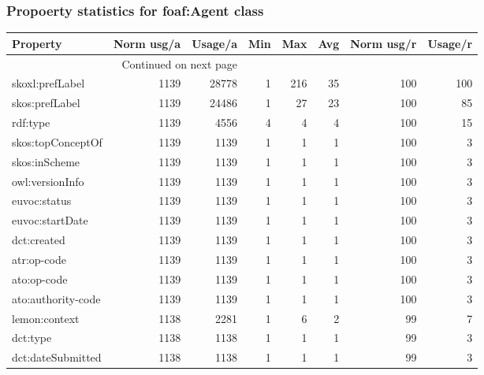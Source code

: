 \documentclass[10pt,a4paper,titlepage,final]{article}
\begin{document}
\subsubsection{Propoerty statistics for foaf:Agent class}
\begin{longtable}{lrrrrrrr}
\toprule
               Property &  Norm usg/a &  Usage/a &  Min &  Max &  Avg &  Norm usg/r &  Usage/r \\
\midrule
\endhead
\midrule
\multicolumn{3}{r}{{Continued on next page}} \\
\midrule
\endfoot

\bottomrule
\endlastfoot
        skoxl:prefLabel &        1139 &    28778 &    1 &  216 &   35 &         100 &      100 \\
         skos:prefLabel &        1139 &    24486 &    1 &   27 &   23 &         100 &       85 \\
               rdf:type &        1139 &     4556 &    4 &    4 &    4 &         100 &       15 \\
      skos:topConceptOf &        1139 &     1139 &    1 &    1 &    1 &         100 &        3 \\
          skos:inScheme &        1139 &     1139 &    1 &    1 &    1 &         100 &        3 \\
        owl:versionInfo &        1139 &     1139 &    1 &    1 &    1 &         100 &        3 \\
           euvoc:status &        1139 &     1139 &    1 &    1 &    1 &         100 &        3 \\
        euvoc:startDate &        1139 &     1139 &    1 &    1 &    1 &         100 &        3 \\
            dct:created &        1139 &     1139 &    1 &    1 &    1 &         100 &        3 \\
            atr:op-code &        1139 &     1139 &    1 &    1 &    1 &         100 &        3 \\
            ato:op-code &        1139 &     1139 &    1 &    1 &    1 &         100 &        3 \\
     ato:authority-code &        1139 &     1139 &    1 &    1 &    1 &         100 &        3 \\
          lemon:context &        1138 &     2281 &    1 &    6 &    2 &          99 &        7 \\
               dct:type &        1138 &     1138 &    1 &    1 &    1 &          99 &        3 \\
      dct:dateSubmitted &        1138 &     1138 &    1 &    1 &    1 &          99 &        3 \\

\end{longtable}
\end{document}
